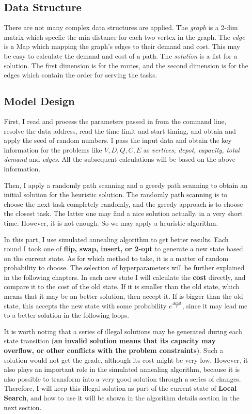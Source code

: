 \documentclass[conference,compsoc]{IEEEtran}
\begin{document}
\subsection{Data Structure} 
There are not many complex data structures are applied. The \emph{graph} is a 2-dim matrix which specfic the min-distance for each two vertex in the graph. The \emph{edge} is a Map which mapping the graph's edges to their demand and cost. This may be easy to calculate the demand and cost of a path. The \emph{solution} is a list for a solution. The first dimension is for the routes, and the second dimension is for the edges which contain the order for serving the tasks.

\subsection{Model Design}
First, I read and process the parameters passed in from the command line, resolve the data address, read the time limit and start timing, and obtain and apply the seed of random numbers. I pass the input data and obtain the key information for the problems like $V, D, Q, C, E$ as \emph{vertices, depot, capacity, total demand} and \emph{edges}. All the subsequent calculations will be based on the above information.

Then, I apply a randomly path scanning and a greedy path scanning to obtain an initial solution for the heuristic solution. The randomly path scanning is to choose the next task completely randomly, and the greedy approach is to choose the closest task. The latter one may find a nice solution actually, in a very short time. However, it is not enough. So we may apply a heuristic algorithm.

In this part, I use simulated annealing algorithm to get better results. Each round I took one of \textbf{flip, swap, insert, or 2-opt} to generate a new state based on the current state. As for which method to take, it is a matter of random probability to choose. The selection of hyperparameters will be further explained in the following chapters. In each new state I will calculate the \textbf{cost} directly, and compare it to the cost of the old state. If it is smaller than the old state, which means that it may be an better solution, then accept it. If is bigger than the old state, this accepts the new state with some probability $e^{\frac{\Delta cost}{T}}$, since it may lead me to a better solution in the following loops.

It is worth noting that a series of illegal solutions may be generated during each state transition (\textbf{an invalid solution means that its capacity may overflow, or other conflicts with the problem constraints}). Such a solution would not get the grade, although its cost might be very low. However, it also plays an important role in the simulated annealing algorithm, because it is also possible to transform into a very good solution through a series of changes. Therefore, I will keep this illegal solution as part of the current state of \textbf{Local Search}, and how to use it will be shown in the algorithm details section in the next section.
\end{document}
